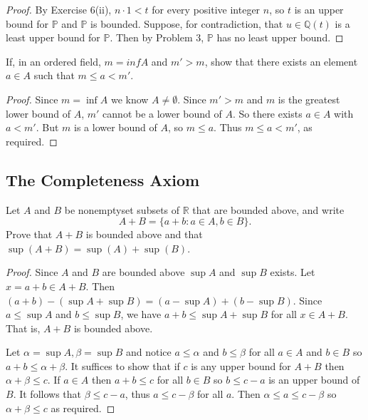\begin{proof}
    By Exercise 6(ii), $n \cdot 1 < t$ for every positive integer $n$, so $t$ is an
        upper bound for $\mathbb{P}$ and $\mathbb{P}$ is bounded.
    Suppose, for contradiction, that $u \in \mathbb{Q}(t)$ is a least upper bound for $\mathbb{P}$.
    Then by Problem 3, $\mathbb{P}$ has no least upper bound.
\end{proof}

\begin{tcolorbox}[title=Problem 4, breakable]
    If, in an ordered field, $m = inf A$ and $m' > m$,
    show that there exists an element $a \in A$ such that $m \le a < m'$.
\end{tcolorbox}

\begin{proof}
    Since $m = \inf A$ we know $A \ne \emptyset$.
    Since $m' > m$ and $m$ is the greatest lower bound of $A$, $m'$ cannot be a lower bound of $A$.
    So there exists $a \in A$ with $a < m'$.
    But $m$ is a lower bound of $A$, so $m \le a$.
    Thus $m \le a < m'$, as required.
\end{proof}

\subsection{The Completeness Axiom}

\begin{tcolorbox}[title=Problem 1, breakable]
    Let $A$ and $B$ be nonemptyset subsets of $\mathbb{R}$ that are bounded above,
    and write 
    \[A + B = \{a + b : a \in A, b \in B\}.\]
    Prove that $A + B$ is bounded above and that $\sup(A + B) = \sup(A) + \sup(B)$.
\end{tcolorbox}

\begin{proof}
    Since $A$ and $B$ are bounded above $\sup A$ and $\sup B$ exists.
    Let $x = a + b \in A + B$.
    Then $(a + b) - (\sup A + \sup B) = (a - \sup A) + (b - \sup B)$.
    Since $a \le \sup A$ and $b \le \sup B$, we have $a + b \le \sup A + \sup B$
        for all $x \in A + B$.
    That is, $A + B$ is bounded above.

    Let $\alpha = \sup A, \beta = \sup B$ 
        and notice $a \le \alpha$ and $b \le \beta$
        for all $a \in A$ and $b \in B$
        so $a + b \le \alpha + \beta$.
    It suffices to show that if $c$ is any upper bound 
    for $A + B$ then $\alpha + \beta \le c$.
    If $a \in A$ then $a + b \le c$ for all $b \in B$
        so $b \le c - a$ is an upper bound of $B$.
    It follows that $\beta \le c - a$, thus $a \le c - \beta$
        for all $a$.
    Then $\alpha \le a \le c - \beta$
        so $\alpha + \beta \le c$ as required.
\end{proof}

